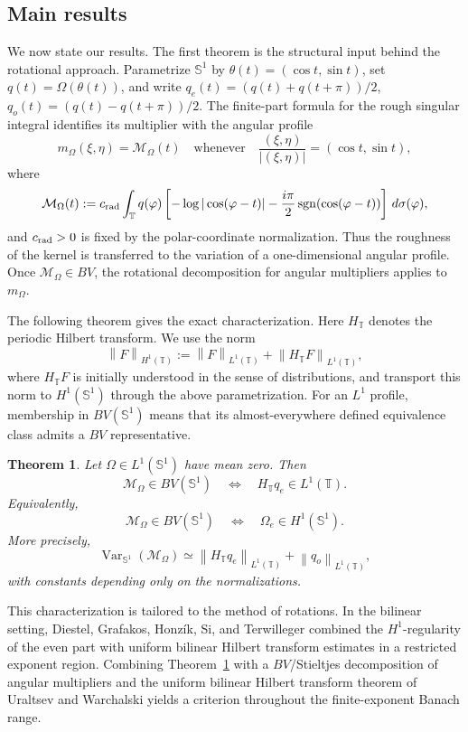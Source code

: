 \documentclass[11pt]{amsart}
\newtheorem{theorem}[definition]{Theorem}
\theoremstyle{remark}
\numberwithin{equation}{section}
\newcommand{\T}{\mathbb T}
\newcommand{\Sph}{\mathbb S^1}
\newcommand{\cM}{\mathcal M}
\newcommand{\norm}[1]{\left\lVert #1\right\rVert}
\newcommand{\abs}[1]{\left\lvert #1\right\rvert}
\newcommand{\sgn}{\operatorname{sgn}}
\newcommand{\Var}{\operatorname{Var}}
\begin{document}
	\subsection{Main results}
	
	We now state our results.  The first theorem is the structural input behind
	the rotational approach.  Parametrize \(\Sph\) by
	\(\theta(t)=(\cos t,\sin t)\), set \(q(t)=\Omega(\theta(t))\), and write
	\(q_e(t)=(q(t)+q(t+\pi))/2\), \(q_o(t)=(q(t)-q(t+\pi))/2\).  The finite-part
	formula for the rough singular integral identifies its multiplier with the
	angular profile
	\[
	m_\Omega(\xi,\eta)=\cM_\Omega(t)
	\quad\text{whenever}\quad
	\frac{(\xi,\eta)}{\abs{(\xi,\eta)}}=(\cos t,\sin t),
	\]
	where
	\[
	\cM_\Omega(t)
	:=
	c_{\rm rad}\int_{\T}q(\varphi)
	\left[
	-\log|\cos(\varphi-t)|
	-\frac{i\pi}{2}\sgn(\cos(\varphi-t))
	\right]\,d\sigma(\varphi),
	\]
	and \(c_{\rm rad}>0\) is fixed by the polar-coordinate normalization.  Thus the
	roughness of the kernel is transferred to the variation of a one-dimensional
	angular profile.  Once \(\cM_\Omega\in BV\), the rotational decomposition for
	angular multipliers applies to \(m_\Omega\).
	
	The following theorem gives the exact characterization.  Here \(H_\T\) denotes the
	periodic Hilbert transform.  We use the norm
	\[
	\norm F_{H^1(\T)}
	:=
	\norm F_{L^1(\T)}+\norm{H_\T F}_{L^1(\T)},
	\]
	where \(H_\T F\) is initially understood in the sense of distributions, and
	transport this norm to \(H^1(\Sph)\) through the above parametrization.  For an
	\(L^1\) profile, membership in \(BV(\Sph)\) means that its almost-everywhere
	defined equivalence class admits a \(BV\) representative.
	
	\begin{theorem}
		\label{thm:profile-characterization}
		Let \(\Omega\in L^1(\Sph)\) have mean zero. Then
		\[
		\cM_\Omega\in BV(\Sph)
		\quad\Longleftrightarrow\quad
		H_\T q_e\in L^1(\T).
		\]
		Equivalently,
		\[
		\cM_\Omega\in BV(\Sph)
		\quad\Longleftrightarrow\quad
		\Omega_e\in H^1(\Sph).
		\]
		More precisely,
		\[
		\Var_{\Sph}(\cM_\Omega)
		\simeq
		\norm{H_\T q_e}_{L^1(\T)}
		+
		\norm{q_o}_{L^1(\T)},
		\]
		with constants depending only on the normalizations.
	\end{theorem}
	
	This characterization is tailored to the method of rotations.  In the
	bilinear setting, Diestel, Grafakos, Honz\'ik, Si, and Terwilleger
	\cite{DGHST2011} combined the \(H^1\)-regularity of the even part with uniform
	bilinear Hilbert transform estimates in a restricted exponent region.
	Combining Theorem~\ref{thm:profile-characterization} with a \(BV\)/Stieltjes
	decomposition of angular multipliers and the uniform bilinear Hilbert transform
	theorem of Uraltsev and Warchalski \cite{UraltsevWarchalski2022} yields a
	criterion throughout the finite-exponent Banach range.
	
\end{document}
